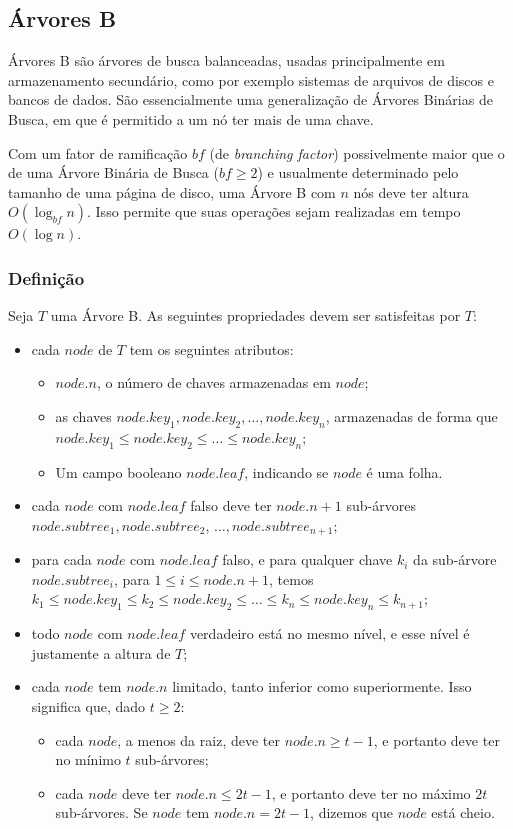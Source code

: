 \documentclass[11pt]{article}
\begin{document}
\subsection{Árvores B}
\label{sec:orgda04522}

Árvores B são árvores de busca balanceadas, usadas principalmente
em armazenamento secundário, como por exemplo sistemas de arquivos
de discos e bancos de dados.  São essencialmente uma generalização
de Árvores Binárias de Busca, em que é permitido a um nó ter mais
de uma chave.

Com um fator de ramificação \(bf\) (de \emph{branching factor})
possivelmente maior que o de uma Árvore Binária de Busca (\(bf \geq
   2\)) e usualmente determinado pelo tamanho de uma página de disco,
uma Árvore B com \(n\) nós deve ter altura \(O(\log_{bf} n)\).  Isso
permite que suas operações sejam realizadas em tempo \(O(\log n)\).

\subsubsection{Definição}
\label{sec:org72d625a}

Seja \(T\) uma Árvore B. As seguintes propriedades devem ser
satisfeitas por \(T\):
\begin{itemize}
\item cada \(node\) de \(T\) tem os seguintes atributos:
\begin{itemize}
\item \(node.n\), o número de chaves armazenadas em \(node\);
\item as chaves \(node.key_1, node.key_2, \dots, node.key_n\),
armazenadas de forma que \(node.key_1 \leq node.key_2 \leq
        \dots \leq node.key_n\);
\item Um campo booleano \(node.leaf\), indicando se \(node\) é uma
folha.
\end{itemize}
\item cada \(node\) com \(node.leaf\) falso deve ter \(node.n + 1\)
sub-árvores \(node.subtree_1, node.subtree_2\), \(\dots,
      node.subtree_{n + 1}\);
\item para cada \(node\) com \(node.leaf\) falso, e para qualquer chave
\(k_i\) da sub-árvore \(node.subtree_i\), para \(1 \leq i \leq
      node.n + 1\), temos \(k_1 \leq node.key_1 \leq k_2 \leq node.key_2
      \leq \dots \leq k_n \leq node.key_n \leq k_{n + 1}\);
\item todo \(node\) com \(node.leaf\) verdadeiro está no mesmo nível, e
esse nível é justamente a altura de \(T\);
\item cada \(node\) tem \(node.n\) limitado, tanto inferior como
superiormente.  Isso significa que, dado \(t \geq 2\):
\begin{itemize}
\item cada \(node\), a menos da raiz, deve ter \(node.n \geq t - 1\), e
portanto deve ter no mínimo \(t\) sub-árvores;
\item cada \(node\) deve ter \(node.n \leq 2t - 1\), e portanto deve ter
no máximo \(2t\) sub-árvores.  Se \(node\) tem \(node.n = 2t - 1\),
dizemos que \(node\) está cheio.
\end{itemize}
\end{itemize}
\end{document}
